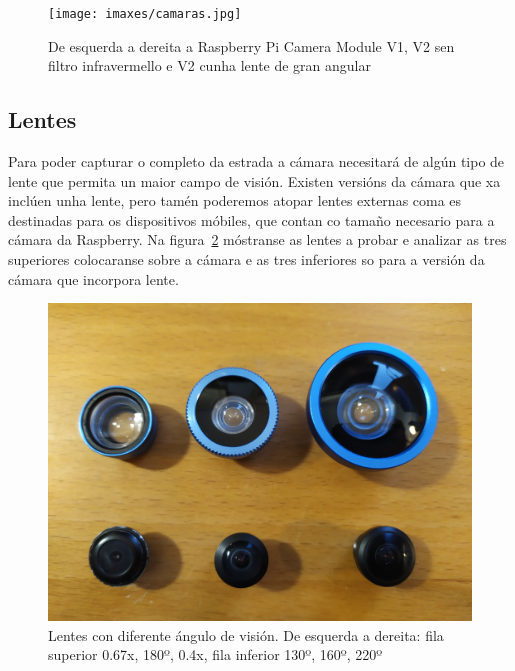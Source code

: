 \begin{figure}[tb]
  \centering
  \texttt{[image: imaxes/camaras.jpg]}
  \caption{De esquerda a dereita a Raspberry Pi Camera Module V1, V2 sen filtro infravermello e V2 cunha lente de gran angular}
  \label{fig:camaras}
\end{figure}
\subsection{Lentes}
Para poder capturar o completo da estrada a cámara necesitará de algún tipo de lente que permita un maior campo de visión. Existen versións da cámara que xa inclúen unha lente, pero tamén poderemos atopar lentes externas coma es destinadas para os dispositivos móbiles, que contan co tamaño necesario para a cámara da Raspberry. Na figura~\ref{fig:lentes} móstranse as lentes a probar e analizar as tres superiores colocaranse sobre a cámara e as tres inferiores so para a versión da cámara que incorpora lente.
\begin{figure}[tb]
  \centering
  \includegraphics[scale=.06]{imaxes/lentes.jpg}
  \caption{Lentes con diferente ángulo de visión. De esquerda a dereita: fila superior 0.67x, 180º, 0.4x, fila inferior 130º, 160º, 220º }
  \label{fig:lentes}
\end{figure}

